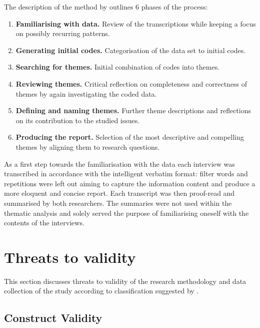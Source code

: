 
The description of the method by \citet{braun2006using} outlines 6 phases of the process:

\begin{enumerate}
  \item \textbf{Familiarising with data.} Review of the transcriptions while keeping a focus on possibly recurring patterns.
  \item \textbf{Generating initial codes.} Categorisation of the data set to initial codes.
  \item \textbf{Searching for themes.} Initial combination of codes into themes.
  \item \textbf{Reviewing themes.} Critical reflection on completeness and correctness of themes by again investigating the coded data.
  \item \textbf{Defining and naming themes.} Further theme descriptions and reflections on its contribution to the studied issues.
  \item \textbf{Producing the report.} Selection of the most descriptive and compelling themes by aligning them to research questions.
\end{enumerate}

As a first step towards the familiarisation with the data each interview was transcribed in accordance with the intelligent verbatim format: filter words and repetitions were left out aiming to capture the information content and produce a more eloquent and concise report. Each transcript was then proof-read and summarised by both researchers. The summaries were not used within the thematic analysis and solely served the purpose of familiarising oneself with the contents of the interviews.

\section{Threats to validity}

This section discusses threats to validity of the research methodology and data collection of the study according to classification suggested by \citet{runeson}.

\subsection{Construct Validity}

